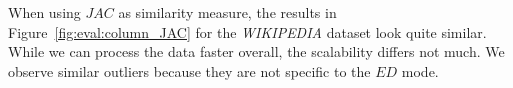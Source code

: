 When using $JAC$ as similarity measure, the results in Figure~\ref{fig:eval:column_JAC} for the \emph{WIKIPEDIA} dataset look quite similar.
While we can process the data faster overall, the scalability differs not much.
We observe similar outliers because they are not specific to the $ED$ mode.

